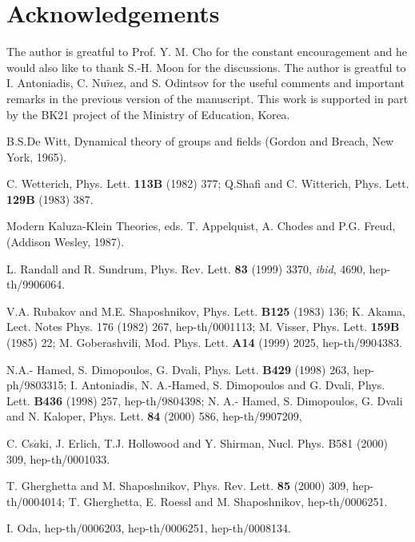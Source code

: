 \documentclass[a4paper,12pt]{article}
\begin{document}
\section*{Acknowledgements}
The author is greatful to Prof. Y. M. Cho for the constant 
encouragement and he would also like to thank S.-H. Moon for the 
discussions. The author is greatful to I. Antoniadis, C. Nu$\tilde{n}$ez, 
and S. Odintsov for the useful comments and important remarks in the 
previous version of the manuscript. This work is supported in part by the 
BK21 project of the Ministry of Education, Korea.
\begin{thebibliography}{99}
 B.S.De Witt, Dynamical theory of groups and fields 
(Gordon and Breach, New York, 1965). 

 C. Wetterich, Phys. Lett. {\bf 113B} (1982) 377; Q.Shafi 
and C. Witterich, Phys. Lett. {\bf 129B} (1983) 387.  

 Modern Kaluza-Klein Theories, eds. T. Appelquist, 
A. Chodes and P.G. Freud, (Addison Wesley, 1987).

 L. Randall and R. Sundrum, Phys. Rev. Lett. {\bf 83} (1999) 
3370, {\it ibid}, 4690, hep-th/9906064.

 V.A. Rubakov and M.E. Shaposhnikov, Phys. Lett. {\bf B125} 
(1983) 136; K. Akama, Lect. Notes Phys. 176 (1982) 267, hep-th/0001113; 
M. Visser, Phys. Lett. {\bf 159B} (1985) 22; M. Goberashvili, 
Mod. Phys. Lett. {\bf A14} (1999) 2025, hep-th/9904383.

 N.A.- Hamed, S. Dimopoulos, G. Dvali, Phys. Lett. {\bf B429} 
(1998) 263, hep-ph/9803315; I. Antoniadis, N. A.-Hamed, S. Dimopoulos and 
G. Dvali, Phys. Lett. {\bf B436} (1998) 257, hep-th/9804398; N. A.- Hamed, 
S. Dimopoulos, G. Dvali and N. Kaloper, Phys. Lett. {\bf 84} (2000) 586, 
hep-th/9907209, 

  C. Cs$\acute{a}$ki, J. Erlich, T.J. Hollowood and Y. Shirman, 
Nucl. Phys. {B581} (2000) 309, hep-th/0001033.

 T. Gherghetta and M. Shaposhnikov, Phys. Rev. Lett. {\bf 85} 
(2000) 309, hep-th/0004014; T. Gherghetta, E. Roessl and M. Shaposhnikov, 
hep-th/0006251.  

 I. Oda, hep-th/0006203, hep-th/0006251, hep-th/0008134.


\end{thebibliography}
\end{document}
